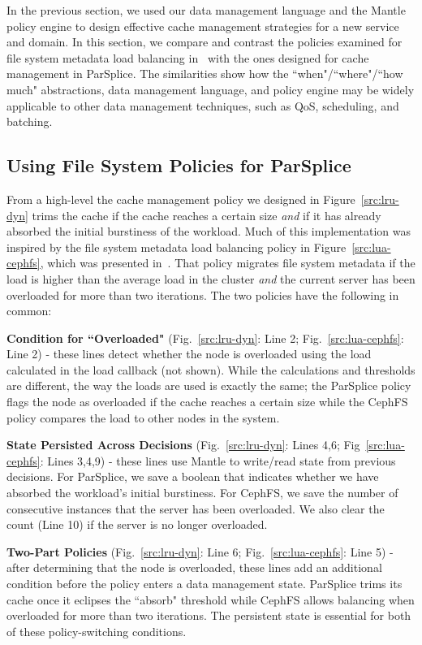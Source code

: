 In the previous section, we used our data management language and the Mantle
policy engine to design effective cache management strategies for a new service
and domain. In this section, we compare and contrast the policies examined for
file system metadata load balancing in~\cite{sevilla:sc15-mantle} with the ones
designed for cache management in ParSplice. The similarities show how the
``when"/``where"/``how much" abstractions, data management language, and policy
engine may be widely applicable to other data management techniques, such as
QoS, scheduling, and batching.

\subsection{Using File System Policies for ParSplice}

From a high-level the cache management policy we designed in
Figure~\ref{src:lru-dyn} trims the cache if the cache reaches a certain size
{\it and} if it has already absorbed the initial burstiness of the workload.
Much of this implementation was inspired by the file system metadata load
balancing policy in Figure~\ref{src:lua-cephfs}, which was presented
in~\cite{sevilla:sc15-mantle}. That policy migrates file system metadata if the
load is higher than the average load in the cluster {\it and} the current
server has been overloaded for more than two iterations. The two policies have
the following in common:

\textbf{Condition for ``Overloaded"} (Fig.~\ref{src:lru-dyn}: Line 2;
Fig.~\ref{src:lua-cephfs}: Line 2) - these lines detect whether the node is
overloaded using the load calculated in the load callback (not shown). While
the calculations and thresholds are different, the way the loads are used is
exactly the same; the ParSplice policy flags the node as overloaded if the
cache reaches a certain size while the CephFS policy compares the load to other
nodes in the system.

\textbf{State Persisted Across Decisions} (Fig.~\ref{src:lru-dyn}: Lines 4,6;
Fig~\ref{src:lua-cephfs}: Lines 3,4,9) - these lines use Mantle to write/read state
from previous decisions.  For ParSplice, we save a boolean that indicates
whether we have absorbed the workload's initial burstiness. For CephFS, we save
the number of consecutive instances that the server has been overloaded. We
also clear the count (Line 10) if the server is no longer overloaded. 

\textbf{Two-Part Policies} (Fig.~\ref{src:lru-dyn}: Line 6;
Fig.~\ref{src:lua-cephfs}: Line 5) - after determining that the node is
overloaded, these lines add an additional condition before the policy enters a
data management state.  ParSplice trims its cache once it eclipses the
``absorb" threshold while CephFS allows balancing when overloaded for more than
two iterations. The persistent state is essential for both of these
policy-switching conditions.

